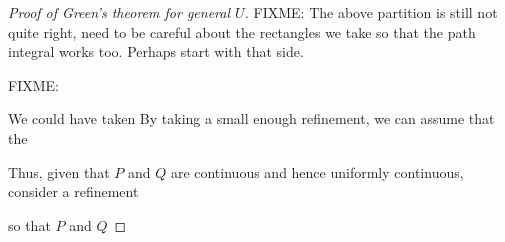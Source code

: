 \begin{proof}[Proof of Green's theorem for general $U$]
FIXME: The above partition is still not quite right, need to be careful
about the rectangles we take so that the path integral works too.  Perhaps
start with that side.

FIXME:

We could have taken
By taking a small enough refinement, we can assume that the 



Thus, given that $P$ and $Q$ are continuous and hence
uniformly continuous, consider a refinement

so that $P$ and $Q$




\end{proof}
